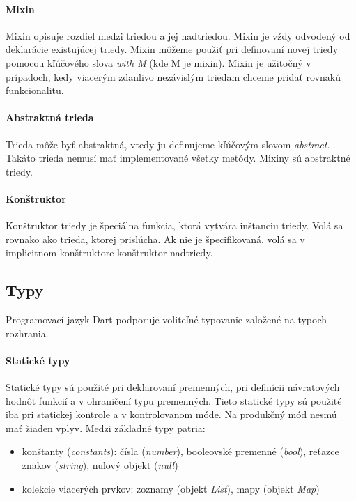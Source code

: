 \paragraph{Mixin}
\label{par:mixins}
Mixin opisuje rozdiel medzi triedou a jej nadtriedou. Mixin je vždy odvodený od deklarácie existujúcej triedy.
Mixin môžeme použiť pri definovaní novej triedy pomocou kľúčového slova \emph{with M} (kde M je mixin).
Mixin je užitočný v prípadoch, kedy viacerým zdanlivo nezávislým triedam chceme pridať rovnakú funkcionalitu.

\paragraph{Abstraktná trieda}
Trieda môže byť abstraktná, vtedy ju definujeme kľúčovým slovom \emph{abstract}. Takáto trieda nemusí mať implementované všetky metódy. Mixiny sú abstraktné triedy.

\paragraph{Konštruktor}
Konštruktor triedy je špeciálna funkcia, ktorá vytvára inštanciu triedy. Volá sa rovnako ako trieda, ktorej prislúcha. 
Ak nie je špecifikovaná, volá sa v implicitnom konštruktore konštruktor nadtriedy. %

\subsection{Typy}
\label{subsec:typy}
Programovací jazyk Dart podporuje voliteľné typovanie založené na typoch rozhrania.

\paragraph{Statické typy}
Statické typy sú použité pri deklarovaní premenných, pri definícii návratových hodnôt funkcií a v ohraničení typu premenných. 
Tieto statické typy sú použité iba pri statickej kontrole a v kontrolovanom móde. Na produkčný mód nesmú mať žiaden vplyv.
Medzi základné typy patria:
\begin{itemize}
\item konštanty (\emph{constants}): čísla (\emph{number}), booleovské premenné (\emph{bool}), reťazce znakov (\emph{string}), nulový objekt (\emph{null})
\item kolekcie viacerých prvkov: zoznamy (objekt \emph{List}), mapy (objekt \emph{Map})
\end{itemize}

